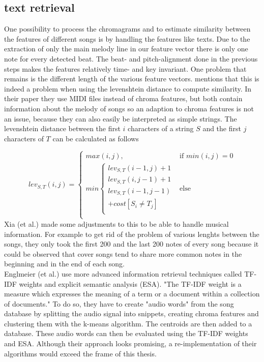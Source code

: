 \subsection{text retrieval}

One possibility to process the chromagrams and to estimate similarity between the features of different songs is by handling the features like texts. Due to the extraction of only the main melody line in our feature vector there is only one note for every detected beat. The beat- and pitch-alignment done in the previous steps makes the features relatively time- and key invariant. One problem that remains is the different length of the various feature vectors. \cite{chroma4} mentions that this is indeed a problem when using the levenshtein distance to compute similarity. In their paper they use MIDI files instead of chroma features, but both contain information about the melody of songs so an adaption to chroma features is not an issue, because they can also easily be interpreted as simple strings. The levenshtein distance between the first $i$ characters of a string $S$ and the first $j$ characters of $T$ can be calculated as follows \cite[p. 7]{chroma4}

\begin{equation} \label{eq:tr1}
lev_{S,T}(i, j) = \begin{cases}
max(i, j), &\text{if } min(i, j) = 0\\
min \begin{cases}
lev_{S,T}(i-1, j) + 1\\
lev_{S,T}(i, j-1) + 1\\
lev_{S,T}(i-1, j-1)\\
+cost[S_i \neq T_j]\\
\end{cases} &\text{else} \\
\end{cases}
\end{equation}
Xia (et al.) made some adjustments to this to be able to handle musical information.\cite[pp. 7ff]{chroma4} For example to get rid of the problem of various lenghts between the songs, they only took the first 200 and the last 200 notes of every song because it could be observed that cover songs tend to share more common notes in the beginning and in the end of each song.
\ \\
Englmeier  (et al.) use more advanced information retrieval techniques called TF-IDF weights and explicit semantic analysis (ESA). "The TF-IDF weight is a measure which expresses the meaning of a term or a document within a collection of documents." \cite[p. 186]{chroma1}
To do so, they have to create "audio words" from the song database by splitting the audio signal into snippets, creating chroma features and clustering them with the k-means algorithm. The centroids are then added to a database. These audio words can then be evaluated using the TF-IDF weights and ESA.
Although their approach looks promising, a re-implementation of their algorithms would exceed the frame of this thesis.


